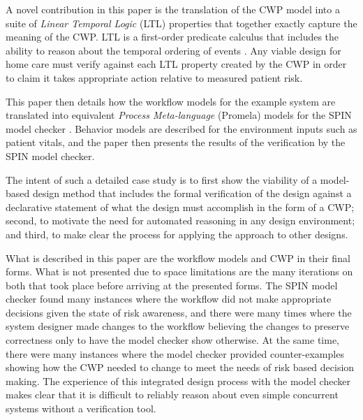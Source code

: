 A novel contribution in this paper is the translation of the CWP model into a suite of \emph{Linear Temporal Logic} (LTL) properties that together exactly capture the meaning of the CWP. LTL is a first-order predicate calculus that includes the ability to reason about the temporal ordering of events \cite{10.5555/975331}. Any viable design for home care must verify against each LTL property created by the CWP in order to claim it takes appropriate action relative to measured patient risk.

This paper then details how the workflow models for the example system are translated into equivalent \emph{Process Meta-language} (Promela) models for the SPIN model checker \cite{spin}. Behavior models are described for the environment inputs such as patient vitals, and the paper then presents the results of the verification by the SPIN model checker. 

The intent of such a detailed case study is to first show the viability of a model-based design method that includes the formal verification of the design against a declarative statement of what the design must accomplish in the form of a CWP; second, to motivate the need for automated reasoning in any design environment; and third, to make clear the process for applying the approach to other designs.  

What is described in this paper are the workflow models and CWP in their final forms. What is not presented due to space limitations are the many iterations on both that took place before arriving at the presented forms. The SPIN model checker found many instances where the workflow did not make appropriate decisions given the state of risk awareness, and there were many times where the system designer made changes to the workflow believing the changes to preserve correctness only to have the model checker show otherwise. At the same time, there were many instances where the model checker provided counter-examples showing how the CWP needed to change to meet the needs of risk based decision making. The experience of this integrated design process with the model checker makes clear that it is difficult to reliably reason about even simple concurrent systems without a verification tool.